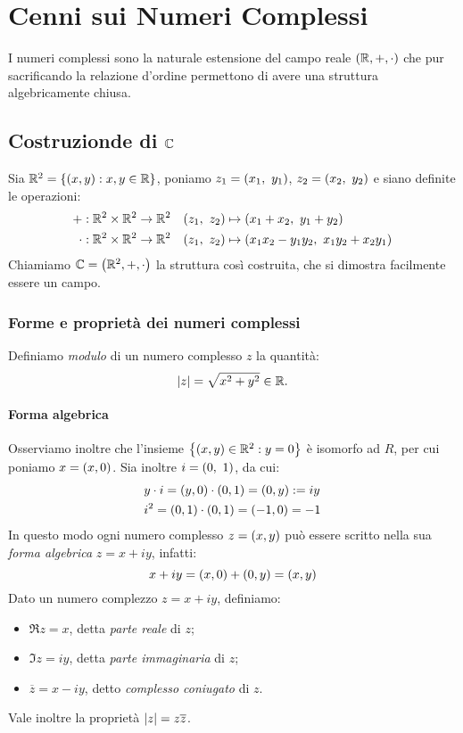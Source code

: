 \chapter{Cenni sui Numeri Complessi}\label{app:A}
I numeri complessi sono la naturale estensione del campo reale $\qty(\mathbb{R},+,\cdot)$ che pur sacrificando la relazione d'ordine permettono di avere una struttura algebricamente chiusa.
\section{Costruzionde di $\mathbb{C}$}
Sia $\mathbb{R}^2=\qty{\qty(x,y):x,y\in\mathbb{R}}$, poniamo $z_1=\qty(x_1,\ y_1)$, $z_2=\qty(x_2,\ y_2)$ e siano definite le operazioni:
\begin{align*}
    \func{+}{\R^2\times\R^2}{\R^2}\quad&\qty(z_1,\ z_2)\mapsto\qty(x_1+x_2,\ y_1+y_2)\\
    \func{\cdot}{\R^2\times\R^2}{\R^2}\quad&\qty(z_1,\ z_2)\mapsto\qty(x_1x_2-y_1y_2,\ x_1y_2+x_2y_1)
\end{align*}
Chiamiamo $\mathbb{C}=\qty(\mathbb{R}^2,+,\cdot)$ la struttura cos\`i costruita, che si dimostra facilmente essere un campo.
\subsection{Forme e propriet\`a dei numeri complessi}
    Definiamo \emph{modulo} di un numero complesso $z$ la quantit\`a: $$\abs{z}=\sqrt{x^2+y^2}\in\mathbb{R}.$$ 
    \subsubsection{Forma algebrica}
        Osserviamo inoltre che l'insieme $\qty{\qty(x,y)\in\mathbb{R}^2:y=0}$ \`e isomorfo ad $R$, per cui poniamo $x=\qty(x,0)$. Sia inoltre $i=\qty(0,\ 1)$, da cui:
        \begin{align*}
            &y\cdot i=\qty(y,0)\cdot(0,1)=(0,y):=iy\\
            &i^2=\qty(0,1)\cdot\qty(0,1)=(-1,0)=-1
        \end{align*}
        In questo modo ogni numero complesso $z=\qty(x,y)$ pu\`o essere scritto nella sua \emph{forma algebrica} $z=x+iy$, infatti: $$x+iy=\qty(x,0)+\qty(0,y)=(x,y)$$
        Dato un numero complezzo $z=x+iy$, definiamo:
        \begin{itemize}
            \item $\Re z=x$, detta \emph{parte reale} di $z$;
            \item $\Im z=iy$, detta \emph{parte immaginaria} di $z$;
            \item $\overline{z}=x-iy$, detto \emph{complesso coniugato} di $z$.
        \end{itemize}
        Vale inoltre la propriet\`a $\abs{z}=z\overline{z}$.
